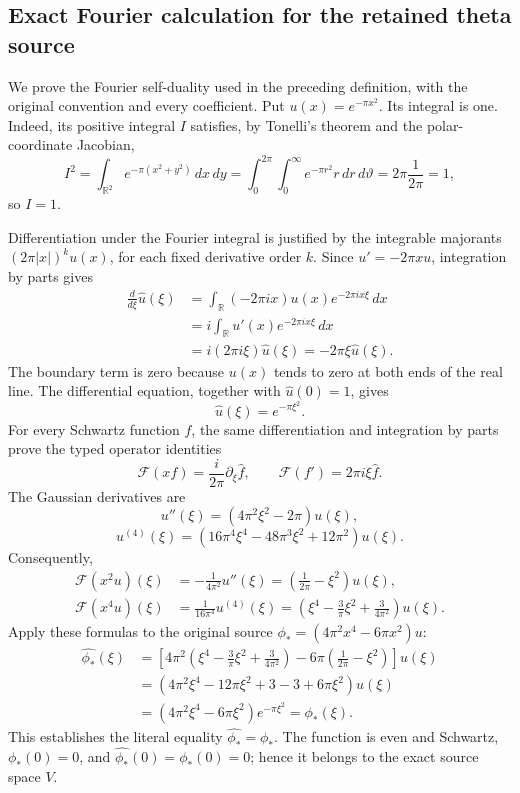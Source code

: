 \subsection{Exact Fourier calculation for the retained theta source}
\label{lem:typed-route-fourier-phi-star}

We prove the Fourier self-duality used in the preceding definition, with
the original convention and every coefficient. Put
\(u(x)=e^{-\pi x^2}\). Its integral is one. Indeed, its positive integral
\(I\) satisfies, by Tonelli's theorem and the polar-coordinate Jacobian,
\[
I^2=\int_{\mathbb R^2}e^{-\pi(x^2+y^2)}\,dx\,dy
 =\int_0^{2\pi}\int_0^\infty e^{-\pi r^2}r\,dr\,d\vartheta
 =2\pi\frac1{2\pi}=1,
\]
so \(I=1\).

Differentiation under the Fourier integral is justified by the integrable
majorants \((2\pi|x|)^k u(x)\), for each fixed derivative order \(k\).
Since \(u'=-2\pi xu\), integration by parts gives
\[
\begin{aligned}
\frac{d}{d\xi}\widehat u(\xi)
 &=\int_{\mathbb R}(-2\pi ix)u(x)e^{-2\pi ix\xi}\,dx\\
 &=i\int_{\mathbb R}u'(x)e^{-2\pi ix\xi}\,dx\\
 &=i(2\pi i\xi)\widehat u(\xi)
 =-2\pi\xi\widehat u(\xi).
\end{aligned}
\]
The boundary term is zero because \(u(x)\) tends to zero at both
ends of the real line. The differential equation, together with
\(\widehat u(0)=1\), gives
\[
\widehat u(\xi)=e^{-\pi\xi^2}.
\]
For every Schwartz function \(f\), the same differentiation and integration
by parts prove the typed operator identities
\[
\mathcal F(xf)=\frac{i}{2\pi}\partial_\xi\widehat f,\qquad
\mathcal F(f')=2\pi i\xi\widehat f.
\]
The Gaussian derivatives are
\[
u''(\xi)=(4\pi^2\xi^2-2\pi)u(\xi),
\]
\[
u^{(4)}(\xi)=
(16\pi^4\xi^4-48\pi^3\xi^2+12\pi^2)u(\xi).
\]
Consequently,
\[
\begin{aligned}
\mathcal F(x^2u)(\xi)
 &=-\frac1{4\pi^2}u''(\xi)
   =\left(\frac1{2\pi}-\xi^2\right)u(\xi),\\
\mathcal F(x^4u)(\xi)
 &=\frac1{16\pi^4}u^{(4)}(\xi)
   =\left(\xi^4-\frac3\pi\xi^2+\frac3{4\pi^2}\right)u(\xi).
\end{aligned}
\]
Apply these formulas to the original source
\(\phi_*=(4\pi^2x^4-6\pi x^2)u\):
\[
\begin{aligned}
\widehat{\phi_*}(\xi)
 &=\left[
 4\pi^2\left(\xi^4-\frac3\pi\xi^2+\frac3{4\pi^2}\right)
 -6\pi\left(\frac1{2\pi}-\xi^2\right)\right]u(\xi)\\
 &=(4\pi^2\xi^4-12\pi\xi^2+3-3+6\pi\xi^2)u(\xi)\\
 &=(4\pi^2\xi^4-6\pi\xi^2)e^{-\pi\xi^2}
 =\phi_*(\xi).
\end{aligned}
\]
This establishes the literal equality
\(\widehat{\phi_*}=\phi_*\). The function is even and Schwartz,
\(\phi_*(0)=0\), and
\(\widehat{\phi_*}(0)=\phi_*(0)=0\); hence it belongs to the exact source
space \(V\).

